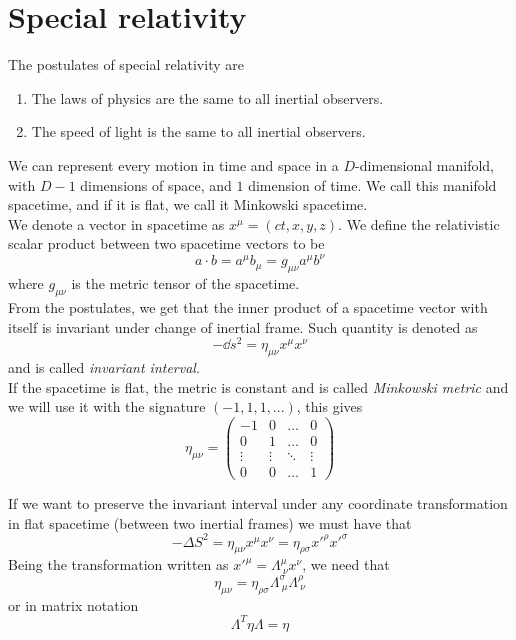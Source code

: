 \documentclass{myclass}
\begin{document}
\section{Special relativity}
The postulates of special relativity are
\begin{enumerate}
    \item The laws of physics are the same to all inertial observers.
    \item The speed of light is the same to all inertial observers.
\end{enumerate}\par

We can represent every motion in time and space in a \(D\)-dimensional manifold, with \(D-1\) dimensions of space, and \(1\) dimension of time. We call this manifold spacetime, and if it is flat, we call it Minkowski spacetime.\\

We denote a vector in spacetime as \(x^{\mu} = (ct,x,y,z)\). We define the relativistic scalar product between two spacetime vectors to be
\[a\cdot b = a^{\mu}b_ {\mu} = g_{\mu\nu}a^{\mu}b^{\nu}\]
where \( g_{\mu\nu}\) is the metric tensor of the spacetime.\\

From the postulates, we get that the inner product of a spacetime vector with itself is invariant under change of inertial frame. Such quantity is denoted as
\[-\dd{s}^2 = \eta_{\mu \nu}x^{\mu}x^{\nu} \]
and is called \textit{invariant interval}.\\

If the spacetime is flat, the metric is constant and is called \textit{Minkowski metric} and we will use it with the signature \((-1,1,1,...)\), this gives
\[ \eta_{\mu \nu} = 
\begin{pmatrix}
-1 &  0  & \ldots & 0\\
0  &  1 & \ldots & 0\\
\vdots & \vdots & \ddots & \vdots\\
0  &   0       &\ldots & 1
\end{pmatrix}\]

If we want to preserve the invariant interval under any coordinate transformation in flat spacetime (between two inertial frames) we must have that
\[-\Delta S^2 = \eta_{\mu \nu}x^{\mu}x^{\nu} = \eta_{\rho \sigma}x'^{\rho}x'^{\sigma} \]
Being the transformation written as \( x'^{\mu} = \Lambda^{\mu}_ {\ \nu}x^{\nu}\), we need that
\[ \eta_{\mu \nu} = \eta_{\rho \sigma}\Lambda^{\sigma}_ {\ \mu}\Lambda^{\rho}_ {\ \nu}\]
or in matrix notation
\[ \Lambda^{T} \eta \Lambda = \eta\]
\end{document}
